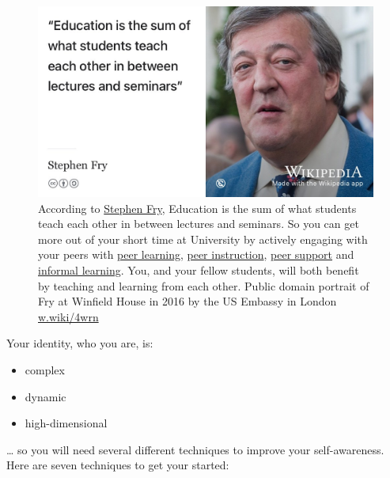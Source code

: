 \documentclass[
]{book}
\providecommand{\tightlist}{%
  \setlength{\itemsep}{0pt}\setlength{\parskip}{0pt}}
\begin{document}
\begin{figure}

{\centering \includegraphics[width=1\linewidth]{images/fry-lecture} 

}

\caption{According to \href{https://en.wikipedia.org/wiki/Stephen_Fry}{Stephen Fry}, Education is the sum of what students teach each other in between lectures and seminars. \citep{frychronicles} So you can get more out of your short time at University by actively engaging with your peers with \href{https://en.wikipedia.org/wiki/Peer_learning}{peer learning}, \href{https://en.wikipedia.org/wiki/Peer_instruction}{peer instruction}, \href{http://www.peersupport.manchester.ac.uk/}{peer support} and \href{https://en.wikipedia.org/wiki/Informal_learning}{informal learning}. You, and your fellow students, will both benefit by teaching and learning from each other. Public domain portrait of Fry at Winfield House in 2016 by the US Embassy in London \href{https://w.wiki/4wrn}{w.wiki/4wrn}}\label{fig:stephen-fry-lecture-fig}
\end{figure}



Your identity, who you are, is:

\begin{itemize}
\tightlist
\item
  complex
\item
  dynamic
\item
  high-dimensional
\end{itemize}

\ldots{} so you will need several different techniques to improve your self-awareness. Here are seven techniques to get your started:
\end{document}
